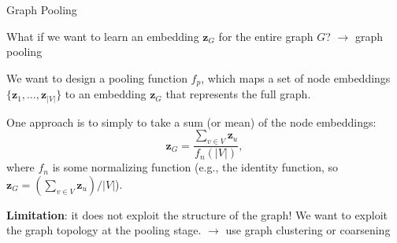 \documentclass[10pt, aspectratio=169, compress, protectframetitle, handout]{beamer}
\begin{document}
\begin{frame}{Graph Pooling}

    What if we want to learn an embedding $\mathbf z_G$ for the entire graph $G$? $\longrightarrow$ \alert{graph pooling}
    
    We want to design a pooling function $f_p$, which maps a set of node embeddings $\{\mathbf z_1, \ldots, \mathbf z_{|V|} \}$ to an embedding $\mathbf z_G$ that represents the full graph.
    
    One approach is to simply to take a sum (or mean) of the node embeddings:
    \begin{equation}
        \mathbf z_G = \frac{\sum_{v \in V} \mathbf z_u}{f_n(|V|)},
    \end{equation}
    where $f_n$ is some normalizing function (e.g., the identity function, so $\mathbf z_G = (\sum_{v \in V} \mathbf z_u)/|V|$).
    \bigskip
    
    \textbf{Limitation}: it does not exploit the structure of the graph! We want to exploit the graph topology at the pooling stage. $\longrightarrow$ use \alert{graph clustering or coarsening}
    
\end{frame}
\end{document}

